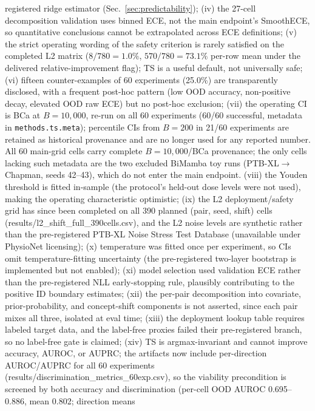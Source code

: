 \documentclass[review,12pt,nonatbib]{elsarticle}
\begin{document}
registered ridge estimator
(Sec.~\ref{sec:predictability}); (iv) the 27-cell decomposition validation uses binned ECE,
not the main endpoint's SmoothECE, so quantitative conclusions cannot be
extrapolated across ECE definitions; (v) the strict operating wording of
the safety criterion is rarely satisfied on the completed L2 matrix
($8/780 = 1.0\%$, $570/780 = 73.1\%$ per-row mean under the delivered
relative-improvement flag); TS is a
useful default, not universally safe; (vi) fifteen counter-examples of 60
experiments (25.0\%) are transparently disclosed, with a frequent post-hoc pattern
(low OOD accuracy, non-positive decay, elevated OOD raw ECE) but no
post-hoc exclusion; (vii) the operating CI is BCa at $B=10{,}000$,
re-run on all 60 experiments (60/60 successful, metadata in
\texttt{methods.ts.meta}); percentile CIs from $B=200$ in 21/60
experiments are retained as historical provenance and are no longer
used for any reported number. All 60 main-grid cells carry complete
$B=10{,}000$/BCa provenance; the only cells lacking such metadata are
the two excluded BiMamba toy runs
(PTB-XL$\rightarrow$Chapman, seeds 42--43), which do not enter the
main endpoint. (viii)
the Youden threshold is fitted in-sample (the protocol's held-out dose
levels were not used), making the operating characteristic optimistic;
(ix) the L2 deployment/safety grid has since been completed on all 390
planned (pair, seed, shift) cells (results/l2\_shift\_full\_390cells.csv),
and the L2 noise
levels are synthetic rather than the pre-registered PTB-XL Noise Stress
Test Database (unavailable under PhysioNet licensing); (x) temperature
was fitted once per experiment, so CIs omit temperature-fitting
uncertainty (the pre-registered two-layer bootstrap is implemented but
not enabled); (xi) model selection used validation ECE rather than the pre-registered
NLL early-stopping rule, plausibly contributing to the positive ID
boundary estimates; (xii) the per-pair decomposition into covariate,
prior-probability, and concept-shift components is not asserted, since
each pair mixes all three, isolated at eval time; (xiii) the deployment
lookup table requires labeled target data, and the label-free proxies
failed their pre-registered branch, so no label-free gate is claimed;
(xiv) TS is argmax-invariant and cannot improve accuracy, AUROC, or
AUPRC; the artifacts now include per-direction AUROC/AUPRC for all 60
experiments (results/discrimination\_metrics\_60exp.csv), so the
viability precondition is screened by both accuracy and discrimination
(per-cell OOD AUROC 0.695--0.886, mean 0.802; direction means
\end{document}
